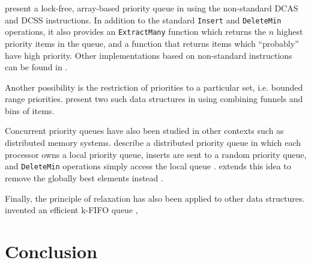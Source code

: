 \documentclass[a4paper,10pt]{article}
\begin{document}

\citeauthor{liu2012lock} present a lock-free, array-based priority queue in \cite{liu2012lock}
using the non-standard \ac{DCAS} and \ac{DCSS} instructions. In addition to the standard
\lstinline|Insert| and \lstinline|DeleteMin| operations, it also provides an \lstinline|ExtractMany|
function which returns the $n$ highest priority items in the queue, and a function that returns
items which ``probably'' have high priority. Other implementations based on non-standard instructions
can be found in \cite{israeli1993efficient,greenwald1999non}.


Another possibility is the restriction of priorities to a particular set, i.e. bounded range priorities.
\citeauthor{shavit1999scalable} present two such data structures in \cite{shavit1999scalable} using
combining funnels and bins of items.


Concurrent priority queues have also been studied in other contexts such as distributed memory systems.
\citeauthor{karp1993randomized} describe a distributed priority queue in which each processor owns
a local priority queue, inserts are sent to a random priority queue, and \lstinline|DeleteMin| operations
simply access the local queue \cite{karp1993randomized}.
\citeauthor{sanders1998randomized} extends this idea to remove the globally best elements instead
\cite{sanders1998randomized}.


Finally, the principle of relaxation has also been applied to other data structures.
\citeauthor{kirsch2012fast} invented an efficient k-FIFO queue \cite{kirsch2012fast},


\begin{comment}
  * hunt: most efficient old-school algorithm
  * lots of other older references in [4]
  * israeli, rappoport: wait-free, non-available atomic primitive
  * lotan, shavit [4]: skiplist, lock-based. first to propose usage of skip-lists [11]
  * sundell, tsigas [3]: skiplist, lock-free, linearizable, unique priorities
  * herlihy, shavit in art of multiprocessor programming: based on [4], lock-free.
  * linden, jonsson [11]: skiplist, lock-free, linearizable, reduced mem contention.
    first lock-free PQ algorithm [11, 12]
  * specialized versions such as
    * bounded priorities: [7] and others
    * probabilistic extractMin, extractMany: [9]
\end{comment}

\section{Conclusion}

\begin{comment}
http://leo.stcloudstate.edu/acadwrite/conclude.html
http://writingcenter.unc.edu/handouts/conclusions/
http://www.wikihow.com/Write-a-Conclusion-for-a-Research-Paper
\end{comment}

\printbibliography
\end{document}
